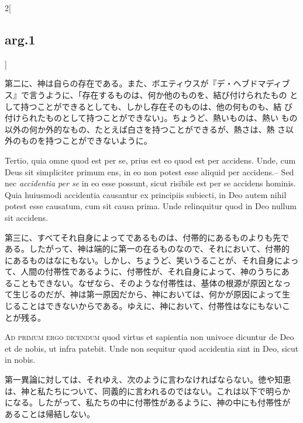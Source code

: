\documentclass[paper=a4paper,fontsize=10pt,jafontsize=9pt,titlepage]{jlreq}
\begin{document}
\begin{paracol}{2}[\subsection{arg.1}]
\switchcolumn

第二に、神は自らの存在である。また、ボエティウスが『デ・ヘブドマディブ
ス』で言うように、「存在するものは、何か他のものを、結び付けられたもの
として持つことができるとしても、しかし存在そのものは、他の何ものも、結
び付けられたものとして持つことができない」。ちょうど、熱いものは、熱い
もの以外の何か外的なもの、たとえば白さを持つことができるが、熱さは、熱
さ以外のものを持つことができないように。

\switchcolumn*

Tertio, quia omne quod est per se, prius est eo quod est per accidens.
Unde, cum Deus sit simpliciter primum ens, in eo non potest esse aliquid
per accidens.-- Sed nec {\itshape accidentia per se} in eo esse possunt,
sicut risibile est per se accidens hominis.  Quia huiusmodi accidentia
causantur ex principiis subiecti, in Deo autem nihil potest esse
causatum, cum sit causa prima. Unde relinquitur quod in Deo nullum sit
accidens.

\switchcolumn

第三に、すべてそれ自身によってであるものは、付帯的にあるものよりも先で
ある。したがって、神は端的に第一の在るものなので、それにおいて、付帯的
にあるものはなにもない。しかし、ちょうど、笑いうることが、それ自身によっ
て、人間の付帯性であるように、付帯性が、それ自身によって、神のうちにあ
ることもできない。なぜなら、そのような付帯性は、基体の根源が原因となっ
て生じるのだが、神は第一原因だから、神においては、何かが原因によって生
じることはできないからである。ゆえに、神において、付帯性はなにもないこ
とが残る。

\switchcolumn*[\subsection{ad.1}]

{\scshape Ad primum ergo dicendum} quod virtus et sapientia non univoce
 dicuntur de Deo et de nobis, ut infra patebit. Unde non sequitur quod
 accidentia sint in Deo, sicut in nobis.

\switchcolumn

第一異論に対しては、それゆえ、次のように言わなければならない。徳や知恵
は、神と私たちについて、同義的に言われるのではない。これは以下で明らか
になる。したがって、私たちの中に付帯性があるように、神の中にも付帯性が
あることは帰結しない。

\switchcolumn*[\subsection{ad.2}]


\end{paracol}
\end{document}
